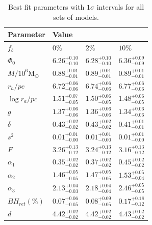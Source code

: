 

\begin{table}
	\centering
	\caption{Best fit parameters with $1\sigma$ intervals for all sets of models.}
	\begin{tabular}{l l l l}

		\hline
		Parameter                 & Value                                                                    \\
		\hline
		$f_b$                     & $0\%$                  & $2\%$                  & $10\%$                 \\
		$\Phi_0$                  & $6.26^{+0.10}_{-0.10}$ & $6.28^{+0.10}_{-0.10}$ & $6.36^{+0.09}_{-0.09}$ \\
		$M/10^6 \mathrm{M}_\odot$ & $0.88^{+0.01}_{-0.01}$ & $0.89^{+0.01}_{-0.01}$ & $0.89^{+0.01}_{-0.01}$ \\
		$r_h / pc$                & $6.72^{+0.06}_{-0.06}$ & $6.74^{+0.06}_{-0.06}$ & $6.77^{+0.06}_{-0.06}$ \\
		$\log{r_a / pc}$          & $1.51^{+0.07}_{-0.05}$ & $1.50^{+0.06}_{-0.05}$ & $1.48^{+0.06}_{-0.05}$ \\
		$g$                       & $1.37^{+0.06}_{-0.06}$ & $1.36^{+0.06}_{-0.06}$ & $1.34^{+0.06}_{-0.06}$ \\
		$\delta$                  & $0.43^{+0.02}_{-0.02}$ & $0.43^{+0.02}_{-0.02}$ & $0.41^{+0.01}_{-0.01}$ \\
		$s^2$                     & $0.01^{+0.01}_{-0.00}$ & $0.01^{+0.01}_{-0.00}$ & $0.01^{+0.01}_{-0.00}$ \\
		$F$                       & $3.26^{+0.13}_{-0.12}$ & $3.24^{+0.13}_{-0.12}$ & $3.16^{+0.13}_{-0.12}$ \\
		$\alpha_1$                & $0.35^{+0.02}_{-0.02}$ & $0.37^{+0.02}_{-0.02}$ & $0.45^{+0.02}_{-0.02}$ \\
		$\alpha_2$                & $1.46^{+0.05}_{-0.05}$ & $1.47^{+0.05}_{-0.05}$ & $1.53^{+0.05}_{-0.04}$ \\
		$\alpha_3$                & $2.13^{+0.04}_{-0.03}$ & $2.18^{+0.04}_{-0.04}$ & $2.46^{+0.05}_{-0.05}$ \\
		$BH_{ret} (\%)$           & $0.07^{+0.06}_{-0.05}$ & $0.08^{+0.09}_{-0.05}$ & $0.17^{+0.18}_{-0.12}$ \\
		$d$                       & $4.42^{+0.02}_{-0.02}$ & $4.42^{+0.02}_{-0.02}$ & $4.43^{+0.02}_{-0.02}$ \\
		\hline
	\end{tabular}
	\label{tab:parameters_all}
\end{table}







